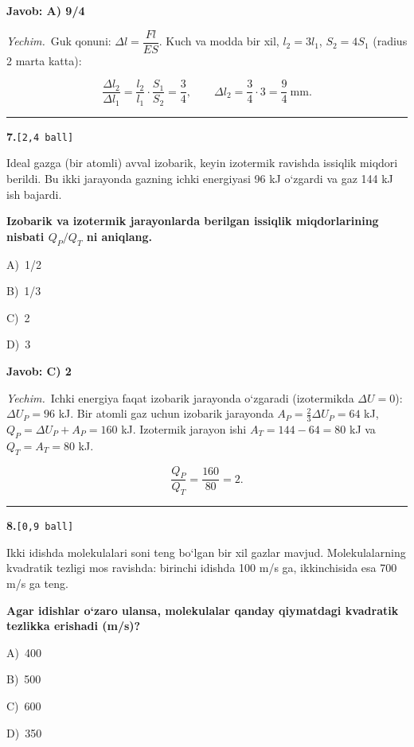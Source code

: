 \documentclass[11pt,a4paper]{article}
\newcommand{\ball}[1]{\hfill\texttt{[#1 ball]}}
\newcommand{\qhead}[2]{\Needspace{10\baselineskip}\noindent\textbf{#1.}\ball{#2}\par\nopagebreak}
\newcommand{\opt}[2]{\hspace*{8mm}#1)\ #2\par}
\newenvironment{qbody}{\begin{list}{}{\leftmargin=8mm\rightmargin=0pt\topsep=0pt\itemsep=0pt\parsep=3pt}\item\relax}{\end{list}}
\begin{document}
\noindent\colorbox{gray!12}{\parbox{\dimexpr\linewidth-2\fboxsep}{\textbf{Javob: A) 9/4}}}\par\smallskip
\noindent\textit{Yechim.}\ Guk qonuni: $\Delta l=\dfrac{Fl}{ES}$. Kuch va modda bir xil, $l_2=3l_1$, $S_2=4S_1$ (radius 2 marta katta):\par
\[\frac{\Delta l_2}{\Delta l_1}=\frac{l_2}{l_1}\cdot\frac{S_1}{S_2}=\frac{3}{4},\qquad \Delta l_2=\frac34\cdot3=\frac94\ \text{mm}.\]\par\medskip\hrule\medskip
\noindent\begin{minipage}{\linewidth}
\qhead{7}{2,4}
\begin{qbody}
Ideal gazga (bir atomli) avval izobarik, keyin izotermik ravishda issiqlik miqdori berildi. Bu ikki jarayonda gazning ichki energiyasi 96 kJ o‘zgardi va gaz 144 kJ ish bajardi.\par
\textbf{Izobarik va izotermik jarayonlarda berilgan issiqlik miqdorlarining nisbati $Q_P/Q_T$ ni aniqlang.}\par
\smallskip
\opt{A}{1/2}
\opt{B}{1/3}
\opt{C}{2}
\opt{D}{3}
\end{qbody}\end{minipage}\par\vspace{2pt}
\noindent\colorbox{gray!12}{\parbox{\dimexpr\linewidth-2\fboxsep}{\textbf{Javob: C) 2}}}\par\smallskip
\noindent\textit{Yechim.}\ Ichki energiya faqat izobarik jarayonda o‘zgaradi (izotermikda $\Delta U=0$): $\Delta U_P=96$ kJ. Bir atomli gaz uchun izobarik jarayonda $A_P=\frac23\Delta U_P=64$ kJ, $Q_P=\Delta U_P+A_P=160$ kJ. Izotermik jarayon ishi $A_T=144-64=80$ kJ va $Q_T=A_T=80$ kJ.\par
\[\frac{Q_P}{Q_T}=\frac{160}{80}=2.\]\par\medskip\hrule\medskip
\noindent\begin{minipage}{\linewidth}
\qhead{8}{0,9}
\begin{qbody}
Ikki idishda molekulalari soni teng bo‘lgan bir xil gazlar mavjud. Molekulalarning kvadratik tezligi mos ravishda: birinchi idishda 100 m/s ga, ikkinchisida esa 700 m/s ga teng.\par
\textbf{Agar idishlar o‘zaro ulansa, molekulalar qanday qiymatdagi kvadratik tezlikka erishadi (m/s)?}\par
\smallskip
\opt{A}{400}
\opt{B}{500}
\opt{C}{600}
\opt{D}{350}
\end{qbody}\end{minipage}\par\vspace{2pt}
\end{document}
